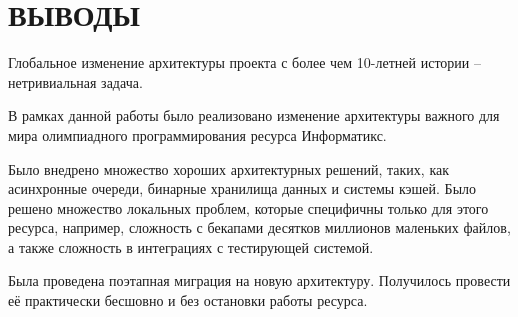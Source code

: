 \chapter{\MakeUppercase{Выводы}}

Глобальное изменение архитектуры проекта с более чем 10-летней истории -- нетривиальная задача.

В рамках данной работы было реализовано изменение архитектуры важного для мира олимпиадного программирования ресурса Информатикс.

Было внедрено множество хороших архитектурных решений, 
таких, как асинхронные очереди, бинарные хранилища данных и системы кэшей.
Было решено множество локальных проблем, которые специфичны только для этого ресурса, 
например, сложность с бекапами десятков миллионов маленьких файлов, а также сложность в интеграциях с тестирующей системой.

Была проведена поэтапная миграция на новую архитектуру.
Получилось провести её практически бесшовно и без остановки работы ресурса.

